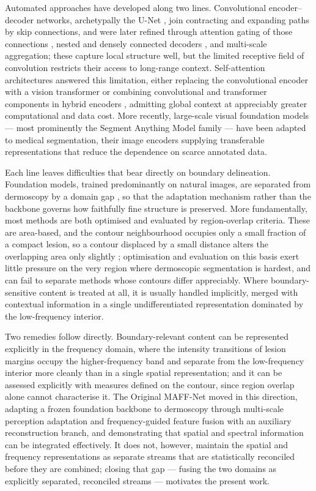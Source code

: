 Automated approaches have developed along two lines. Convolutional encoder--decoder networks, archetypally the U-Net \cite{ref4}, join contracting and expanding paths by skip connections, and were later refined through attention gating of those connections \cite{ref5}, nested and densely connected decoders \cite{ref6}, and multi-scale aggregation; these capture local structure well, but the limited receptive field of convolution restricts their access to long-range context. Self-attention architectures answered this limitation, either replacing the convolutional encoder with a vision transformer \cite{ref7} or combining convolutional and transformer components in hybrid encoders \cite{ref8}, admitting global context at appreciably greater computational and data cost. More recently, large-scale visual foundation models --- most prominently the Segment Anything Model family \cite{ref9,ref10} --- have been adapted to medical segmentation, their image encoders supplying transferable representations that reduce the dependence on scarce annotated data.

Each line leaves difficulties that bear directly on boundary delineation. Foundation models, trained predominantly on natural images, are separated from dermoscopy by a domain gap \cite{ref11}, so that the adaptation mechanism rather than the backbone governs how faithfully fine structure is preserved. More fundamentally, most methods are both optimised and evaluated by region-overlap criteria. These are area-based, and the contour neighbourhood occupies only a small fraction of a compact lesion, so a contour displaced by a small distance alters the overlapping area only slightly \cite{ref12}; optimisation and evaluation on this basis exert little pressure on the very region where dermoscopic segmentation is hardest, and can fail to separate methods whose contours differ appreciably. Where boundary-sensitive content is treated at all, it is usually handled implicitly, merged with contextual information in a single undifferentiated representation dominated by the low-frequency interior.

Two remedies follow directly. Boundary-relevant content can be represented explicitly in the frequency domain, where the intensity transitions of lesion margins occupy the higher-frequency band \cite{ref13,ref14} and separate from the low-frequency interior more cleanly than in a single spatial representation; and it can be assessed explicitly with measures defined on the contour, since region overlap alone cannot characterise it. The Original MAFF-Net \cite{ref15} moved in this direction, adapting a frozen foundation backbone to dermoscopy through multi-scale perception adaptation and frequency-guided feature fusion with an auxiliary reconstruction branch, and demonstrating that spatial and spectral information can be integrated effectively. It does not, however, maintain the spatial and frequency representations as separate streams that are statistically reconciled before they are combined; closing that gap --- fusing the two domains as explicitly separated, reconciled streams --- motivates the present work.

